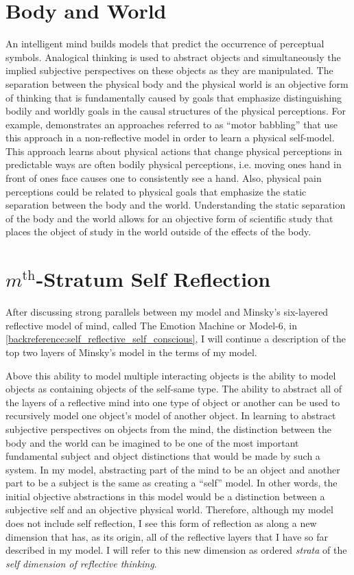 \section{Body and World}

An intelligent mind builds models that predict the occurrence of
perceptual symbols.  Analogical thinking is used to abstract objects
and simultaneously the implied subjective perspectives on these
objects as they are manipulated.  The separation between the physical
body and the physical world is an objective form of thinking that is
fundamentally caused by goals that emphasize distinguishing bodily and
worldly goals in the causal structures of the physical perceptions.
For example, \cite{bongard:2006} demonstrates an approaches referred
to as ``motor babbling'' that use this approach in a non-reflective
model in order to learn a physical self-model.  This approach learns
about physical actions that change physical perceptions in predictable
ways are often bodily physical perceptions, i.e. moving ones hand in
front of ones face causes one to consistently see a hand.  Also,
physical pain perceptions could be related to physical goals that
emphasize the static separation between the body and the world.
Understanding the static separation of the body and the world allows
for an objective form of scientific study that places the object of
study in the world outside of the effects of the body.

\section{$m^\text{th}$-Stratum Self Reflection}

\label{section:model_6_future_research}

After discussing strong parallels between my model and Minsky's
six-layered reflective model of mind, called The Emotion Machine or
Model-6, in \autoref{backreference:self_reflective_self_conscious}, I
will continue a description of the top two layers of Minsky's model in
the terms of my model.

Above this ability to model multiple interacting objects is the
ability to model objects as containing objects of the self-same type.
The ability to abstract all of the layers of a reflective mind into
one type of object or another can be used to recursively model one
object's model of another object.  In learning to abstract subjective
perspectives on objects from the mind, the distinction between the
body and the world can be imagined to be one of the most important
fundamental subject and object distinctions that would be made by such
a system.  In my model, abstracting part of the mind to be an object
and another part to be a subject is the same as creating a ``self''
model.  In other words, the initial objective abstractions in this
model would be a distinction between a subjective self and an
objective physical world.  Therefore, although my model does not
include self reflection, I see this form of reflection as along a new
dimension that has, as its origin, all of the reflective layers that I
have so far described in my model.  I will refer to this new dimension
as ordered \emph{strata} of the \emph{self dimension of reflective
  thinking}.

